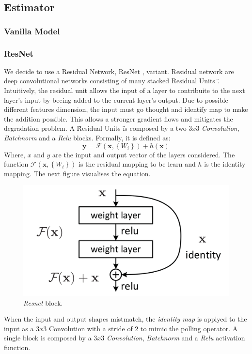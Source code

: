 \documentclass[../document.tex]{subfiles}
\begin{document}
\subsection{Estimator}

\subsubsection{Vanilla Model}
\subsubsection{ResNet}

We decide to use a Residual Network, ResNet \cite{he2015deep}, variant. Residual network are deep convolutional
networks consisting of many stacked \" Residual Units \". Intuitively, the residual unit allows the input of a layer to contribuite to the next layer's input by beeing added to the current layer's output. Due to possible different features dimension, the input must go thought and identify map to make the addition possible. This allows a stronger gradient flows and mitigates the degradation problem. A \"Residual Units \" is composed by a two $3x3$ \emph{Convolution}, \emph{Batchnorm} \cite{ioffe2015batch} and a \emph{Relu} blocks. Formally, it is defined as: 
\begin{equation}
	\mathbf{y}=\mathcal{F}\left(\mathbf{x},\left\{W_{i}\right\}\right)+h(\mathbf{x})
	\label{eq : resnet}
\end{equation}
Where, $x$ and $y$ are the input and output vector of the layers considered. The function $\mathcal{F}\left(\mathbf{x},\left\{W_{i}\right\}\right)$ is the residual mapping to be learn and $h$ is the identity mapping. The next figure visualises the equation.

\begin{figure}[H]
	\centering
	\includegraphics[scale=0.3]{../img/implementation/estimator/resnet_block.png}
	\caption{\emph{Resnet} block.}
\end{figure}
When the input and output shapes mistmatch, the \emph{identity map} is applyed to the input as a $3x3$ Convolution with a stride of 2 to mimic the polling operator. A single block is composed by a $3x3$ \emph{Convolution}, \emph{Batchnorm} and a \emph{Relu} activation function. 
\end{document}
